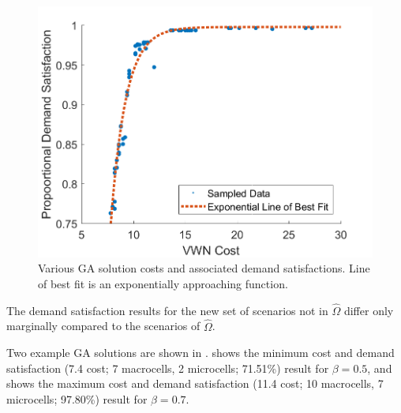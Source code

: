 \documentclass[12pt,dvipsnames]{report}
\begin{document}
\begin{figure}[htp]
	\centering
	\includegraphics[height=0.4\textheight]{Figures/CaseII_GAScatterCostSat}
	\caption[Various Case II GA approach solution costs and associated demand satisfactions]{Various GA solution costs and associated demand satisfactions.  Line of best fit is an exponentially approaching function.}
	\label{fig:CaseII_GAScatterCostSat}
\end{figure} 

The demand satisfaction results for the new set of scenarios not in $\hat{\Omega}$ differ only marginally compared to the scenarios of $\hat{\Omega}$.

Two example GA solutions are shown in .   shows the minimum cost and demand satisfaction (7.4 cost; 7 macrocells, 2 microcells; 71.51\%) result for $\beta = 0.5$, and   shows the maximum cost and demand satisfaction (11.4 cost; 10 macrocells, 7 microcells; 97.80\%) result for $\beta = 0.7$.
\end{document}
